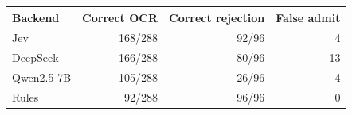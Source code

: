 \begin{tabular}{@{}lrrr@{}}
\toprule
Backend & Correct OCR & Correct rejection & False admit \\
\midrule
Jev & 168/288 & 92/96 & 4 \\
DeepSeek & 166/288 & 80/96 & 13 \\
Qwen2.5-7B & 105/288 & 26/96 & 4 \\
Rules & 92/288 & 96/96 & 0 \\
\bottomrule
\end{tabular}
